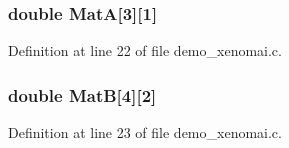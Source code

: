 \subsubsection[{MatA}]{\setlength{\rightskip}{0pt plus 5cm}double {\bf MatA}[3][1]}\label{demo__xenomai_8c_a3437d43ee84dba8231980614a749bb3a}


Definition at line 22 of file demo\_\-xenomai.c.
\subsubsection[{MatB}]{\setlength{\rightskip}{0pt plus 5cm}double {\bf MatB}[4][2]}\label{demo__xenomai_8c_a778870de29c0389f060a5430a7a4f98a}


Definition at line 23 of file demo\_\-xenomai.c.